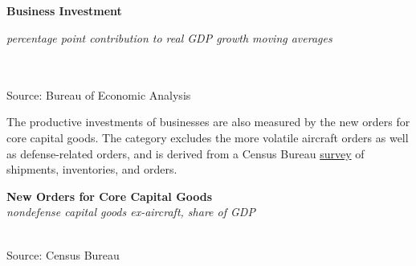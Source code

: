 \documentclass{report}
\newcommand{\tbllink}[1]{\href{https://raw.githubusercontent.com/bdecon/US-chartbook/master/chartbook/data/#1}{\faTable}}
\newcommand{\dateaxisticks}{
		date coordinates in=x, axis line style={draw=none},
		xmax={2020-02-01},
		max space between ticks=40,	    
		xtick={{1990-01-01}, {1992-01-01}, {1994-01-01}, 
			{1996-01-01}, {1998-01-01}, {2000-01-01}, 
			{2002-01-01}, {2004-01-01}, {2006-01-01},
			{2008-01-01}, {2010-01-01}, {2012-01-01}, {2014-01-01},
		    {2016-01-01}, {2018-01-01}, {2020-01-01}},
		minor xtick={{1989-01-01}, {1991-01-01}, {1993-01-01},
			{1995-01-01}, {1997-01-01}, {1999-01-01}, 
			{2001-01-01}, {2003-01-01}, {2005-01-01}, {2007-01-01},
		    {2009-01-01}, {2011-01-01}, {2013-01-01}, {2015-01-01},
		    {2017-01-01}, {2019-01-01}},
		enlarge y limits={0.06}, enlarge x limits={0.01},
		}
\newcommand{\bbar}[2]{extra #1 ticks = {{#2}}, extra #1 tick labels = ,
		extra #1 tick style = {grid=major, grid style={thick, black!25}},}
\newcommand{\thickline}[4]{\addplot[ultra thick, no markers, color=#1] 
		table [x=#2, y=#3, col sep=comma] {#4};	}
\newcommand{\rbars}{
		\fill[color=black!10] (axis cs:{1990-07-01},\pgfkeysvalueof{/pgfplots/ymin}) rectangle 
			(axis cs:{1991-03-01}, \pgfkeysvalueof{/pgfplots/ymax});
		\fill[color=black!10] (axis cs:{2007-12-01},\pgfkeysvalueof{/pgfplots/ymin}) rectangle 
			(axis cs:{2009-07-01}, \pgfkeysvalueof{/pgfplots/ymax});
		\fill[color=black!10] (axis cs:{2001-03-01},\pgfkeysvalueof{/pgfplots/ymin}) rectangle 
			(axis cs:{2001-11-01}, \pgfkeysvalueof{/pgfplots/ymax});}
\begin{document}
{{{\begin{minipage}{0.76\textwidth}
\vspace{3mm}

\small

 

\end{minipage}

\noindent \normalsize \textbf{Business Investment}\\
\footnotesize{\textit{percentage point contribution to real GDP growth \hspace{36mm} moving averages}\\ \vspace{4mm}
\noindent {} \setlength{\tabcolsep}{3.1pt} \color{black!90}
		{\renewcommand{\arraystretch}{1.55}
		 \begin{tabular}{p{42mm} R{6.7mm} R{6.7mm} R{6.7mm} R{6.7mm} R{6.7mm} 
		   R{7.8mm} R{6.7mm} R{6.7mm} }
			 \hline
		\end{tabular}
		}	\\
		
\vspace{-6mm}
\footnotesize{Source: Bureau of Economic Analysis}

\newpage

\begin{minipage}{0.37\textwidth}

\small The productive investments of businesses are also measured by the new orders for core capital goods. The category excludes the more volatile aircraft orders as well as defense-related orders, and is derived from a Census Bureau \href{https://www.census.gov/manufacturing/m3/index.html}{survey} of shipments, inventories, and orders.  \\


\end{minipage} \hspace{6mm}
\begin{minipage}{0.39\textwidth}

\noindent \normalsize \textbf{New Orders for Core Capital Goods}\\
\footnotesize{\textit{nondefense capital goods ex-aircraft, share of GDP}}\\
\noindent \hspace*{-2mm} \\
\footnotesize{Source: Census Bureau} \hfill \tbllink{dgno.csv}
\end{minipage}\\

}}}}
\end{document}
